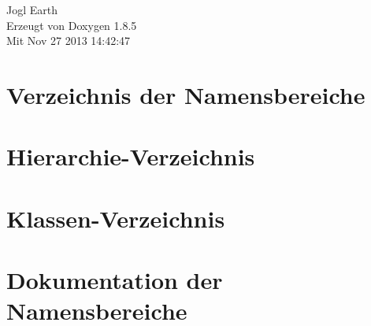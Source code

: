 \documentclass[twoside]{book}
\newcommand{\clearemptydoublepage}{%
  \newpage{\pagestyle{empty}\cleardoublepage}%
}
\begin{document}
\begin{titlepage}
\vspace*{7cm}
\begin{center}%
{\Large Jogl Earth }\\
\vspace*{1cm}
{\large Erzeugt von Doxygen 1.8.5}\\
\vspace*{0.5cm}
{\small Mit Nov 27 2013 14:42:47}\\
\end{center}
\end{titlepage}
\clearemptydoublepage
\tableofcontents
\clearemptydoublepage
{}

\chapter{Verzeichnis der Namensbereiche}

\chapter{Hierarchie-\/\-Verzeichnis}

\chapter{Klassen-\/\-Verzeichnis}

\chapter{Dokumentation der Namensbereiche}













\end{document}
